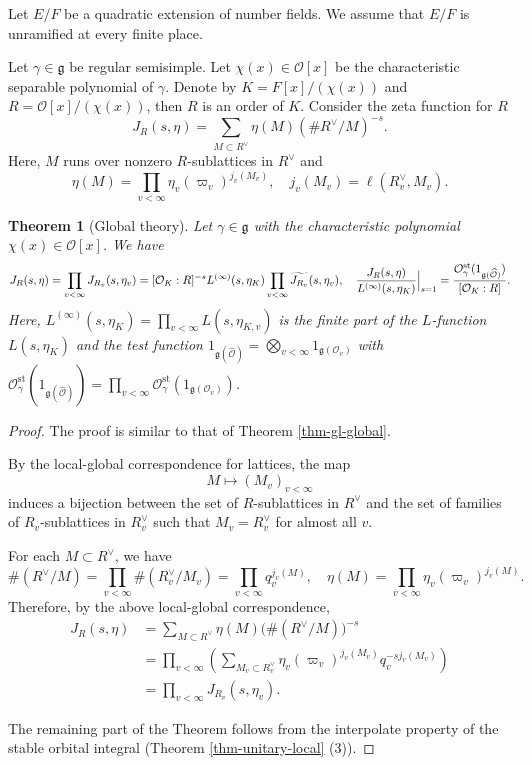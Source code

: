 \documentclass[a4paper]{amsart}
\newcommand{\CO}{{\mathcal {O}}} \newcommand{\CP}{{\mathcal {P}}}
\newcommand{\fg}{{\mathfrak{g}}} \newcommand{\fh}{{\mathfrak{h}}}
\newcommand{\st}{{\mathrm{st}}}\newcommand{\supp}{{\mathrm{supp}}}
\newcommand{\wh}{\widehat}
\theoremstyle{plain}
\newtheorem{thm}{Theorem}[section] \newtheorem{cor}[thm]{Corollary}
\theoremstyle{remark} \newtheorem{remark}[thm]{Remark}
\theoremstyle{exercise} \newtheorem{exercise}[thm]{Exercise}
\theoremstyle{example} \newtheorem{example}[thm]{Example}
\theoremstyle{question} \newtheorem{question}[thm]{Question}
\theoremstyle{assumption} \newtheorem{assumption}[thm]{Assumption}
\numberwithin{equation}{section}
\begin{document}
Let $E/F$ be a quadratic extension of number fields. We assume that $E/F$ is unramified at every finite place. 

Let $\gamma \in \fg$ be regular semisimple. 
Let $\chi(x) \in \CO[x]$ be the characteristic separable polynomial of $\gamma$. Denote by $K = F[x]/(\chi(x))$ and
$R = \CO[x]/(\chi(x))$, then $R$ is an order of $K$. Consider the zeta function for $R$
\[J_R(s,\eta) = \sum_{M \subset R^\vee} \eta(M)\left( \# R^\vee/M \right)^{-s}.\]
Here, $M$ runs over nonzero $R$-sublattices in  $R^\vee$ and 
\[\eta(M) = \prod_{v < \infty} \eta_v(\varpi_v)^{j_v(M_v)}, \quad j_v(M_v) = \ell(R_v^\vee,M_v).\]

\begin{thm}[Global theory]\label{thm-unitary-global} Let $\gamma \in \fg$ with the characteristic polynomial $\chi(x) \in \CO[x]$.  We have
	\[J_R(s,\eta) = \prod_{v < \infty} J_{R_v}(s,\eta_v) = [\CO_K:R]^{-s}L^{(\infty)}(s,\eta_K) \prod_{v < \infty} \wt{J_{R_v}}(s,\eta_v), \quad
	\frac{J_R(s,\eta)}{L^{(\infty)}(s,\eta_K)}\Big|_{s=1} = \frac{\CO_\gamma^\st(1_{\fg(\wh{\CO})})}{[\CO_K:R]}.\]
    Here, $L^{(\infty)}(s,\eta_K) = \prod_{v < \infty} L(s,\eta_{K,v})$ is the finite part of the $L$-function
    $L(s,\eta_K)$ and the test function $1_{\fg(\wh{\CO})} = \bigotimes_{v < \infty} 1_{\fg(\CO_v)}$ with
    $\CO_\gamma^\st(1_{\fg(\wh{\CO})}) = \prod_{v < \infty}\CO_\gamma^\st(1_{\fg(\CO_v)})$.
\end{thm}
\begin{proof}
The proof is similar to that of Theorem \ref{thm-gl-global}. 

By the local-global correspondence for lattices, the map
\[M\mapsto (M_v)_{v<\infty}\]
induces a bijection between the set of $R$-sublattices in $R^\vee$  and the set of families of $R_v$-sublattices in $R_v^\vee$ such that $M_v=R_v^\vee$ for almost all $v$. 

For each $M \subset R^\vee$, we have
\[\#(R^\vee/M)=\prod_{v<\infty}\#(R_v^\vee/M_v)=\prod_{v<\infty}q_v^{j_v(M)}, \quad 
  \eta(M)=\prod_{v<\infty}\eta_v(\varpi_v)^{j_v(M)}.\]
Therefore, by the above local-global correspondence,
\[
\begin{aligned}
  J_R(s,\eta)
  &=\sum_{M\subset R^\vee}
      \eta(M)\bigl(\#(R^\vee/M)\bigr)^{-s} \\
  &=\prod_{v<\infty}
      \left(
        \sum_{M_v\subset R_v^\vee}
        \eta_v(\varpi_v)^{j_v(M_v)}
        q_v^{-s j_v(M_v)}
      \right)                                      \\
  &=\prod_{v<\infty}J_{R_v}(s,\eta_v).
\end{aligned}
\]

The remaining part of the Theorem follows from the
interpolate property of the stable orbital integral (Theorem
\ref{thm-unitary-local} (3)).



\end{proof}
\end{document}

